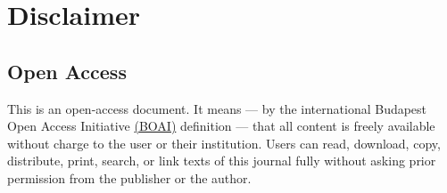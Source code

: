 {}


\thispagestyle{plain}

\chapter*{Disclaimer}

\section*{Open Access}

This is an open-access document.
It means 
--- by the international Budapest Open Access Initiative 
\href{https://www.budapestopenaccessinitiative.org/}{(BOAI)}
definition --- that all content is freely available without charge to the user or their institution.
Users can read, download, copy, distribute, print, search, or link texts of this journal fully without asking prior permission from the publisher or the author.

